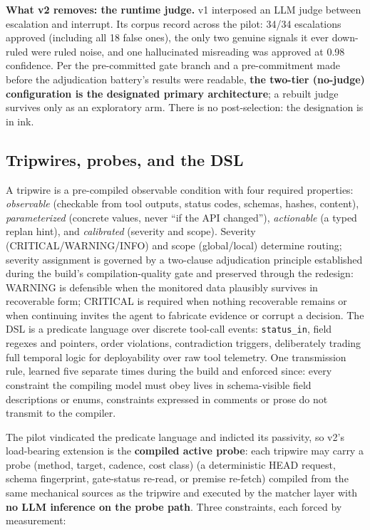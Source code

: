 \documentclass[acmsmall,screen,review,anonymous]{acmart}
\begin{document}
\textbf{What v2 removes: the runtime judge.} v1 interposed an LLM judge between escalation and interrupt. Its corpus record across the pilot: 34/34 escalations approved (including all 18 false ones), the only two genuine signals it ever down-ruled were ruled noise, and one hallucinated misreading was approved at 0.98 confidence. Per the pre-committed gate branch and a pre-commitment made before the adjudication battery's results were readable, \textbf{the two-tier (no-judge) configuration is the designated primary architecture}; a rebuilt judge survives only as an exploratory arm. There is no post-selection: the designation is in ink.

\subsection{Tripwires, probes, and the DSL}
A tripwire is a pre-compiled observable condition with four required properties: \emph{observable} (checkable from tool outputs, status codes, schemas, hashes, content), \emph{parameterized} (concrete values, never ``if the API changed''), \emph{actionable} (a typed replan hint), and \emph{calibrated} (severity and scope). Severity (CRITICAL/WARNING/INFO) and scope (global/local) determine routing; severity assignment is governed by a two-clause adjudication principle established during the build's compilation-quality gate and preserved through the redesign: WARNING is defensible when the monitored data plausibly survives in recoverable form; CRITICAL is required when nothing recoverable remains or when continuing invites the agent to fabricate evidence or corrupt a decision. The DSL is a predicate language over discrete tool-call events: \texttt{status\_in}, field regexes and pointers, order violations, contradiction triggers, deliberately trading full temporal logic \cite{ref4, ref5} for deployability over raw tool telemetry. One transmission rule, learned five separate times during the build and enforced since: every constraint the compiling model must obey lives in schema-visible field descriptions or enums, constraints expressed in comments or prose do not transmit to the compiler.

The pilot vindicated the predicate language and indicted its passivity, so v2's load-bearing extension is the \textbf{compiled active probe}: each tripwire may carry a probe (method, target, cadence, cost class) (a deterministic HEAD request, schema fingerprint, gate-status re-read, or premise re-fetch) compiled from the same mechanical sources as the tripwire and executed by the matcher layer with \textbf{no LLM inference on the probe path}. Three constraints, each forced by measurement:
\end{document}
